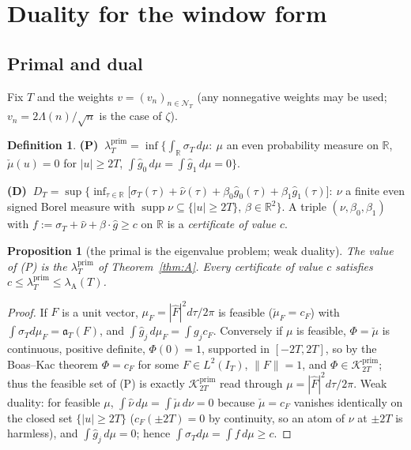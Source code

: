\documentclass[11pt]{amsart}
\newtheorem{proposition}[theorem]{Proposition}
\theoremstyle{definition}
\newtheorem{definition}[theorem]{Definition}
\theoremstyle{remark}
\newcommand{\R}{\mathbb R}
\newcommand{\supp}{\operatorname{supp}}
\newcommand{\Kp}{\mathcal K^{\mathrm{prim}}_{2T}}
\newcommand{\IT}{I_T}
\newcommand{\lamP}{\lambda^{\mathrm{prim}}_T}
\newcommand{\lamA}{\lambda_{\mathrm A}(T)}
\newcommand{\sT}{\sigma_T}
\newcommand{\gh}[1]{\widehat g_{#1}}
\newcommand{\nuh}{\widehat\nu}
\newcommand{\Fh}{\widehat F}
\newcommand{\cF}{c_F}
\newcommand{\NT}{\mathcal N_T}
\begin{document}
\section{Duality for the window form}\label{sec:duality}

\subsection{Primal and dual}
Fix $T$ and the weights $v=(v_n)_{n\in\NT}$ (any nonnegative weights may be used; $v_n=2\Lambda(n)/\sqrt n$
is the case of $\zeta$).

\begin{definition}\label{def:PD}
\textbf{(P)} $\ \lamP=\inf\big\{\int_\R\sT\,d\mu:\ \mu$ an even probability measure on $\R$,
$\check\mu(u)=0$ for $|u|\ge2T$, $\int\gh0\,d\mu=\int\gh1\,d\mu=0\big\}$.

\textbf{(D)} $\ D_T=\sup\big\{\inf_{\tau\in\R}\big[\sT(\tau)+\nuh(\tau)+\beta_0\gh0(\tau)+\beta_1\gh1(\tau)\big]:\
\nu$ a finite even signed Borel measure with $\supp\nu\subseteq\{|u|\ge2T\}$, $\beta\in\R^2\big\}$.
A triple $(\nu,\beta_0,\beta_1)$ with $f:=\sT+\nuh+\beta\cdot\widehat g\ge c$ on $\R$ is a
\emph{certificate of value $c$}.
\end{definition}

\begin{proposition}[the primal is the eigenvalue problem; weak duality]\label{prop:weak}
The value of \textup{(P)} is the $\lamP$ of Theorem~\ref{thm:A}. Every certificate of value $c$
satisfies $c\le\lamP\le\lamA$.
\end{proposition}
\begin{proof}
If $F$ is a unit vector, $\mu_F=|\Fh|^2d\tau/2\pi$ is feasible ($\check\mu_F=\cF$) with
$\int\sT d\mu_F=\mathfrak a_T(F)$, and $\int\gh j\,d\mu_F=\int g_j\cF$. Conversely if $\mu$ is
feasible, $\Phi=\check\mu$ is continuous, positive definite, $\Phi(0)=1$, supported in $[-2T,2T]$,
so by the Boas--Kac theorem \cite{BoasKac1945} $\Phi=\cF$ for some $F\in L^2(\IT)$, $\|F\|=1$, and
$\Phi\in\Kp$; thus the feasible set of (P) is exactly $\Kp$ read through $\mu=|\Fh|^2d\tau/2\pi$.
Weak duality: for feasible $\mu$, $\int\nuh\,d\mu=\int\check\mu\,d\nu=0$ because $\check\mu=\cF$
vanishes identically on the closed set $\{|u|\ge2T\}$ ($\cF(\pm2T)=0$ by continuity, so an atom
of $\nu$ at $\pm2T$ is harmless), and $\int\gh j\,d\mu=0$; hence
$\int\sT d\mu=\int f\,d\mu\ge c$.
\end{proof}
\end{document}
